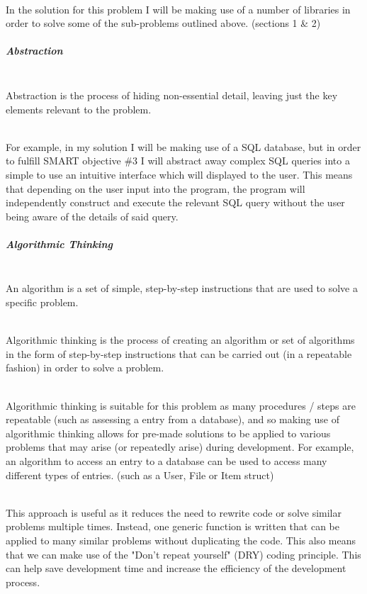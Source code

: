 \documentclass[../../../main.tex]{subfiles}
\begin{document}
\noindent \\ In the solution for this problem I will be making use of a number of libraries
in order to solve some of the sub-problems outlined above. (sections 1 \& 2)

\subparagraph{Abstraction}

\noindent \\ Abstraction is the process of hiding non-essential detail, leaving just the key elements relevant to the problem.

\noindent \\ For example, in my solution I will be making use of a SQL database, but in order to fulfill SMART objective
\#3 I will abstract away complex SQL queries into a simple to use an intuitive interface which
will displayed to the user. This means that depending on the user input into the program, the
program will independently construct and execute the relevant SQL query without the user being
aware of the details of said query.

\subparagraph{Algorithmic Thinking}

\noindent \\ An algorithm is a set of simple, step-by-step instructions that are used to solve a specific problem.

\noindent \\ Algorithmic thinking is the process of creating an algorithm or set of algorithms
in the form of step-by-step instructions that can be carried out (in a repeatable fashion)
in order to solve a problem.

\noindent \\ Algorithmic thinking is suitable for this problem as many procedures / steps are
repeatable (such as assessing a entry from a database), and so making use of algorithmic
thinking allows for pre-made solutions to be applied to various problems that may arise (or repeatedly arise) during
development. For example, an algorithm to access an entry to a database can be used to access
many different types of entries. (such as a User, File or Item struct)

\noindent \\ This approach is useful as it reduces the need to rewrite code or solve similar problems multiple times.
Instead, one generic function is written that can be applied to many similar problems without duplicating the code.
This also means that we can make use of the "Don't repeat yourself" (DRY) coding principle. This can help save development time and increase the efficiency of the development process.
\end{document}
